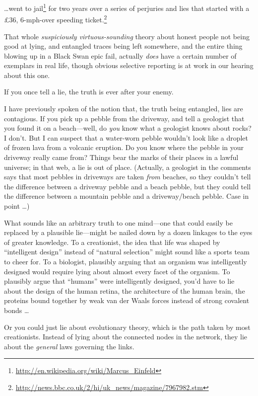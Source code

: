 {
 \ldots went to jail\footnote{\url{http://en.wikipedia.org/wiki/Marcus_Einfeld}} for two years over a series of perjuries and
lies that started with a \pounds 36, 6-mph-over speeding ticket.\footnote{\url{http://news.bbc.co.uk/2/hi/uk_news/magazine/7967982.stm}}}

{
 That whole \textit{suspiciously virtuous-sounding} theory about
honest people not being good at lying, and entangled traces being left
somewhere, and the entire thing blowing up in a Black Swan epic fail,
actually \textit{does} have a certain number of exemplars in real life,
though obvious selective reporting is at work in our hearing about this
one.}

\myendsectiontext


{
 If you once tell a lie, the truth is ever after your enemy. }

{
 I have previously spoken of the notion that, the truth being
entangled, lies are contagious. If you pick up a pebble from the
driveway, and tell a geologist that you found it on a beach---well, do
\textit{you} know what a geologist knows about rocks? I
don't. But I can suspect that a water-worn pebble
wouldn't look like a droplet of frozen lava from a
volcanic eruption. Do you know where the pebble in your driveway really
came from? Things bear the marks of their places in a lawful universe;
in that web, a lie is out of place. (Actually, a geologist in the
comments says that most pebbles in driveways are taken \textit{from}
beaches, so they couldn't tell the difference between a
driveway pebble and a beach pebble, but they could tell the difference
between a mountain pebble and a driveway/beach pebble. Case in point
\ldots)}

{
 What sounds like an arbitrary truth to one mind---one that could
easily be replaced by a plausible lie---might be nailed down by a dozen
linkages to the eyes of greater knowledge. To a creationist, the idea
that life was shaped by ``intelligent
design'' instead of ``natural
selection'' might sound like a sports team to cheer
for. To a biologist, plausibly arguing that an organism was
intelligently designed would require lying about almost every facet of
the organism. To plausibly argue that
``humans'' were intelligently
designed, you'd have to lie about the design of the
human retina, the architecture of the human brain, the proteins bound
together by weak van der Waals forces instead of strong covalent bonds
\ldots}

{
 Or you could just lie about evolutionary theory, which is the path
taken by most creationists. Instead of lying about the connected nodes
in the network, they lie about the \textit{general} laws governing the
links.}

